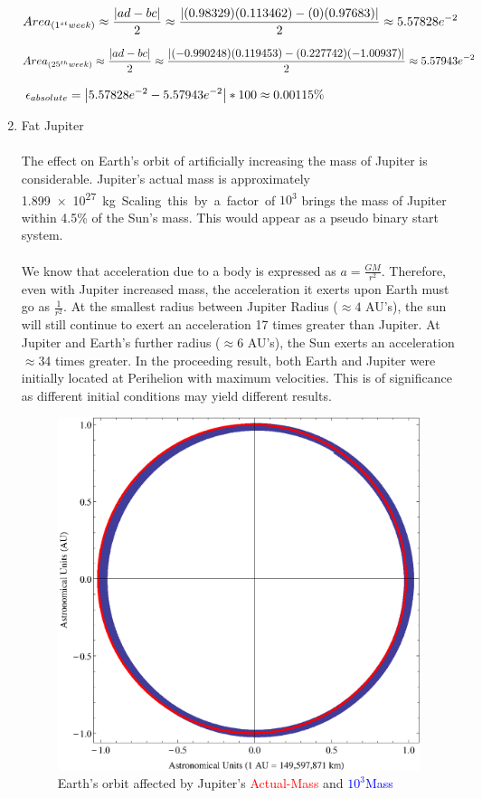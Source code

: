 \documentclass{report}
\begin{document}
\begin{enumerate}
\begin{center}
$\displaystyle Area_{\small (1^{st}week)} \approx \frac{\left|ad-bc\right|}{2} \approx \frac{\left|(0.98329)(0.113462)-(0)(0.97683) \right|}{2} \approx 5.57828e^{-2}$
\end{center}
$\displaystyle Area_{\small (25^{th}week)} \approx \frac{\left|ad-bc\right|}{2} \approx \frac{\left|(-0.990248)(0.119453)-(0.227742)(-1.00937) \right|}{2} \approx 5.57943e^{-2}$
\begin{center}
$\displaystyle \epsilon_{\small absolute} = \left| 5.57828e^{-2} - 5.57943e^{-2}\right| * 100 \approx 0.00115\%$
\end{center}
\item Fat Jupiter
\\
\\The effect on Earth's orbit of artificially increasing the mass of Jupiter is considerable. Jupiter's actual mass is approximately \SI{1.899e27} kg. Scaling this by a factor of $10^3$ brings the mass of Jupiter within 4.5\% of the Sun's mass. This would appear as a pseudo binary start system.
\\
\\We know that acceleration due to a body is expressed as $\displaystyle a = \frac{GM}{r^2}$. Therefore, even with Jupiter increased mass, the acceleration it exerts upon Earth must go as $\displaystyle \frac{1}{r^2}$. At the smallest radius between Jupiter Radius ($\approx 4$ AU's), the sun will still continue to exert an acceleration 17 times greater than Jupiter. At Jupiter and Earth's further radius ($\approx 6$ AU's), the Sun exerts an acceleration $\approx$34 times greater. In the proceeding result, both Earth and Jupiter were initially located at Perihelion with maximum velocities. This is of significance as different initial conditions may yield different results. 
\begin{figure}[H]
\centering \caption{Earth's orbit affected by Jupiter's \textcolor{Red}{Actual-Mass} and \textcolor{blue}{$10^3$Mass}}
\includegraphics[scale=.75]{fatEarth.eps}

\end{figure}
\end{enumerate}
\end{document}
